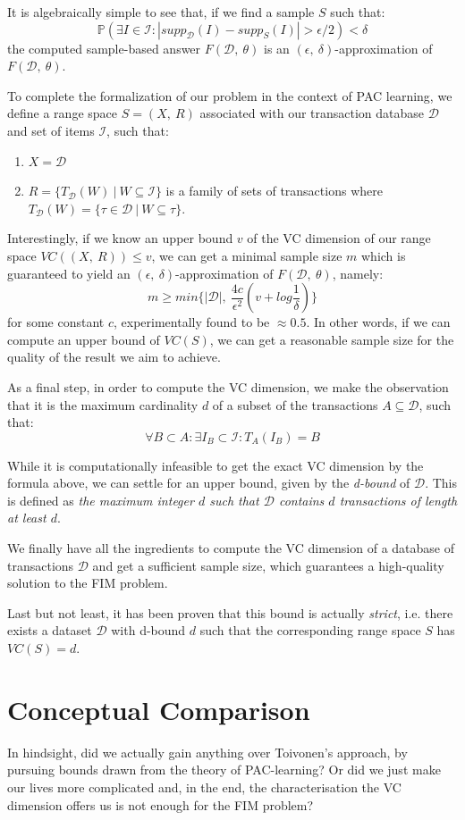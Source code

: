 \documentclass[11pt]{sigplanconf}
\renewcommand\it{\textit}
\newcommand\I{\mathcal{I}}
\newcommand\D{\mathcal{D}}
\renewcommand\P{\mathds{P}}
\begin{document}
It is algebraically simple to see that, if we find a sample $S$ such that:
\[ \P(\exists I \in \I : |supp_{\D}(I) - supp_S(I)| > \epsilon/2) < \delta
\]
the computed sample-based answer $F(\D,\ \theta)$ is an $(\epsilon,\ \delta)$-approximation of $F(\D,\ \theta)$.

To complete the formalization of our problem in the context of PAC learning, we define a range space $S=(X,\ R)$ associated with our transaction database $\D$ and set of items $\I$, such that:
\begin{enumerate}
\item $X = \D$
\item $R = \{ T_{\D}(W) \ | \ W \subseteq \I \}$ is a family of sets of transactions where
$T_{\D}(W) = \{ \tau \in \D \ | \ W \subseteq \tau \}$.
\end{enumerate}

Interestingly, if we know an upper bound $v$ of the VC dimension of our range space $VC((X,\ R)) \leq v$, we can get a minimal sample size $m$ which is guaranteed to yield an $(\epsilon,\ \delta)$-approximation of $F(\D,\ \theta)$, namely:
\[ m \geq min\{ |\D|,\ \frac{4c}{\epsilon^2}(v + log\frac{1}{\delta}) \}
\]
for some constant $c$, experimentally found to be $\approx 0.5$.
In other words, if we can compute an upper bound of $VC(S)$, we can get a reasonable sample size for  the quality of the result we aim to achieve.

As a final step, in order to compute the VC dimension, we make the observation that it is the maximum cardinality $d$ of a subset of the transactions $A \subseteq \D$, such that:
\[ \forall B \subset A: \exists I_B \subset \I : T_A(I_B) = B
\]

While it is computationally infeasible to get the exact VC dimension by the formula above, we can settle for an upper bound, given by the \it{d-bound} of $\D$. This is defined as \it{the maximum integer $d$ such that $\D$ contains $d$ transactions of length at least $d$}.

We finally have all the ingredients to compute the VC dimension of a database of transactions $\D$ and get a sufficient sample size, which guarantees a high-quality solution to the FIM problem.

Last but not least, it has been proven that this bound is actually \it{strict}, i.e. there exists a dataset $\D$ with d-bound $d$ such that the corresponding range space $S$ has $VC(S)=d$.

\section{Conceptual Comparison}
In hindsight, did we actually gain anything over Toivonen's approach, by pursuing bounds drawn from the theory of PAC-learning? Or did we just make our lives more complicated and, in the end, the characterisation the VC dimension offers us is not enough for the FIM problem?
\end{document}
